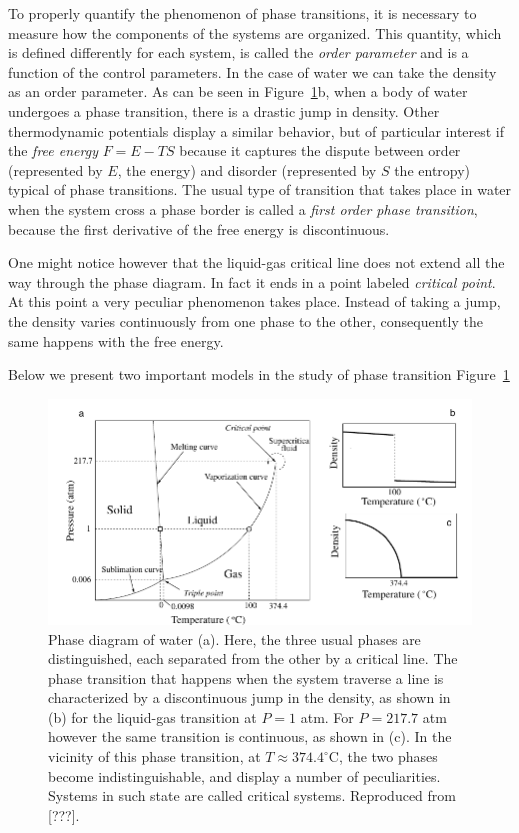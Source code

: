 To properly quantify the phenomenon of phase transitions, it is necessary to
measure how the components of the systems are organized. This quantity, which
is defined differently for each system, is called the \textit{order parameter}
and is a function of the control parameters. In the case of water we can take
the density as an order parameter. As can be seen in Figure~\ref{fig:water}b,
when a body of water undergoes a phase transition, there is a drastic jump in
density. Other thermodynamic potentials display a similar behavior, but of
particular interest if the \textit{free energy} $F=E-TS$ because it captures
the dispute between order (represented by $E$, the energy) and disorder
(represented by $S$ the entropy) typical of phase transitions. The usual type
of transition that takes place in water when the system cross a phase border is
called a \textit{first order phase transition}, because the first derivative of
the free energy is discontinuous.

One might notice however that the liquid-gas critical line does not extend all
the way through the phase diagram. In fact it ends in a point labeled
\textit{critical point}. At this point a very peculiar phenomenon takes place.
Instead of taking a jump, the density varies continuously from one phase to the
other, consequently the same happens with the free energy. 

Below we present two important models in the study of phase transition
Figure~\ref{fig:water} 

\begin{figure}[h]
\begin{center}
    \includegraphics[scale=1.0]{chapters/ch2-crit/figs/water}
\end{center}
\caption{Phase diagram of water (a). Here, the three usual phases are
    distinguished, each separated from the other by a critical line. The phase
    transition that happens when the system traverse a line is characterized by
    a discontinuous jump in the density, as shown in (b) for the liquid-gas
    transition at $P=1$ atm. For $P=217.7$ atm however the same transition is
    continuous, as shown in (c). In the vicinity of this phase transition, at
    $T\approx374.4^\circ$C, the two phases become indistinguishable, and
    display a number of peculiarities. Systems in such state are called
    critical systems. Reproduced from [???].}
\label{fig:water}
\end{figure}


